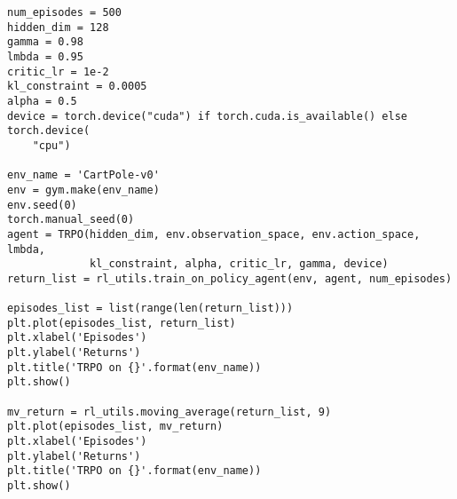 \begin{lstlisting}
num_episodes = 500
hidden_dim = 128
gamma = 0.98
lmbda = 0.95
critic_lr = 1e-2
kl_constraint = 0.0005
alpha = 0.5
device = torch.device("cuda") if torch.cuda.is_available() else torch.device(
    "cpu")

env_name = 'CartPole-v0'
env = gym.make(env_name)
env.seed(0)
torch.manual_seed(0)
agent = TRPO(hidden_dim, env.observation_space, env.action_space, lmbda,
             kl_constraint, alpha, critic_lr, gamma, device)
return_list = rl_utils.train_on_policy_agent(env, agent, num_episodes)

episodes_list = list(range(len(return_list)))
plt.plot(episodes_list, return_list)
plt.xlabel('Episodes')
plt.ylabel('Returns')
plt.title('TRPO on {}'.format(env_name))
plt.show()

mv_return = rl_utils.moving_average(return_list, 9)
plt.plot(episodes_list, mv_return)
plt.xlabel('Episodes')
plt.ylabel('Returns')
plt.title('TRPO on {}'.format(env_name))
plt.show()
\end{lstlisting}

